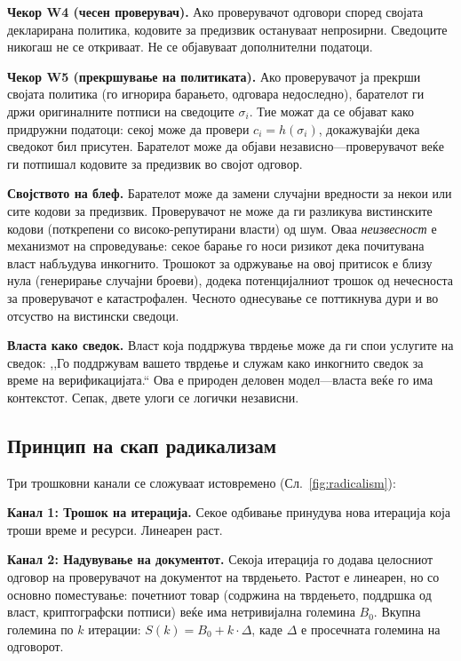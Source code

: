 \documentclass[11pt,a4paper,twocolumn]{article}
\begin{document}
\textbf{Чекор W4 (чесен проверувач).} Ако проверувачот одговори според својата декларирана политика, кодовите за предизвик остануваат непроѕирни. Сведоците никогаш не се откриваат. Не се објавуваат дополнителни податоци.

\textbf{Чекор W5 (прекршување на политиката).} Ако проверувачот ја прекрши својата политика (го игнорира барањето, одговара недоследно), барателот ги држи оригиналните потписи на сведоците $\sigma_i$. Тие можат да се објават како придружни податоци: секој може да провери $c_i = h(\sigma_i)$, докажувајќи дека сведокот бил присутен. Барателот може да објави независно---проверувачот веќе ги потпишал кодовите за предизвик во својот одговор.

\textbf{Својството на блеф.} Барателот може да замени случајни вредности за некои или сите кодови за предизвик. Проверувачот не може да ги разликува вистинските кодови (поткрепени со високо-репутирани власти) од шум. Оваа \emph{неизвесност} е механизмот на спроведување: секое барање го носи ризикот дека почитувана власт набљудува инкогнито. Трошокот за одржување на овој притисок е близу нула (генерирање случајни броеви), додека потенцијалниот трошок од нечесноста за проверувачот е катастрофален. Чесното однесување се поттикнува дури и во отсуство на вистински сведоци.

\textbf{Власта како сведок.} Власт која поддржува тврдење може да ги спои услугите на сведок: ,,Го поддржувам вашето тврдење и служам како инкогнито сведок за време на верификацијата.`` Ова е природен деловен модел---власта веќе го има контекстот. Сепак, двете улоги се логички независни.

\subsection{Принцип на скап радикализам}

Три трошковни канали се сложуваат истовремено (Сл.~\ref{fig:radicalism}):

\textbf{Канал 1: Трошок на итерација.} Секое одбивање принудува нова итерација која троши време и ресурси. Линеарен раст.

\textbf{Канал 2: Надувување на документот.} Секоја итерација го додава целосниот одговор на проверувачот на документот на тврдењето. Растот е линеарен, но со основно поместување: почетниот товар (содржина на тврдењето, поддршка од власт, криптографски потписи) веќе има нетривијална големина $B_0$. Вкупна големина по $k$ итерации: $S(k) = B_0 + k \cdot \Delta$, каде $\Delta$ е просечната големина на одговорот.
\end{document}
